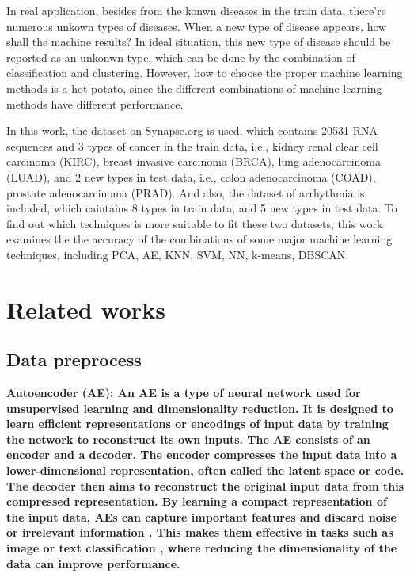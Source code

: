 \documentclass[twocolumn,10pt]{article}
\begin{document}
In real application, besides from the konwn diseases in the train data, there're numerous unkown types of diseases. 
When a new type of disease appears, how shall the machine results? In ideal situation, this new type of disease should be 
reported as an unkonwn type, which can be done by the combination of classification and clustering. 
However, how to choose the proper machine learning methods is a hot potato, since the different combinations 
of machine learning methods have different performance. 

In this work, the dataset on Synapse.org is used, which contains 20531 RNA sequences and 3 types of cancer 
in the train data, i.e., kidney renal clear cell carcinoma (KIRC), breast invasive carcinoma (BRCA), 
lung adenocarcinoma (LUAD), and 2 new types in test data, i.e., colon adenocarcinoma (COAD), 
prostate adenocarcinoma (PRAD). And also, the dataset of arrhythmia is included, which caintains
8 types in train data, and 5 new types in test data. To find out which techniques is more suitable to fit 
these two datasets, this work examines the the accuracy of the combinations of some major machine 
learning techniques, including PCA, AE, KNN, SVM, NN, k-means, DBSCAN. 

\section{Related works}
\label{sec:Related works}

\subsection*{Data preprocess}

\bf{Autoencoder (AE)}: \rm{An} AE is a type of neural network used for unsupervised 
learning and dimensionality reduction. It is designed to learn efficient representations or encodings of 
input data by training the network to reconstruct its own inputs. The AE consists of an encoder 
and a decoder. The encoder compresses the input data into a lower-dimensional representation, often called 
the latent space or code. The decoder then aims to reconstruct the original input data from this compressed 
representation. By learning a compact representation of the input data, AEs can capture important features 
and discard noise or irrelevant information \cite{lu2013speech}. This makes them effective in tasks such as 
image \cite{zhang2018better} \cite{lore2017llnet} \cite{cheng2018deep} or text classification \cite{xu2017variational} 
\cite{xu2019semisupervised}, where reducing the dimensionality of the data can improve performance.
\end{document}
